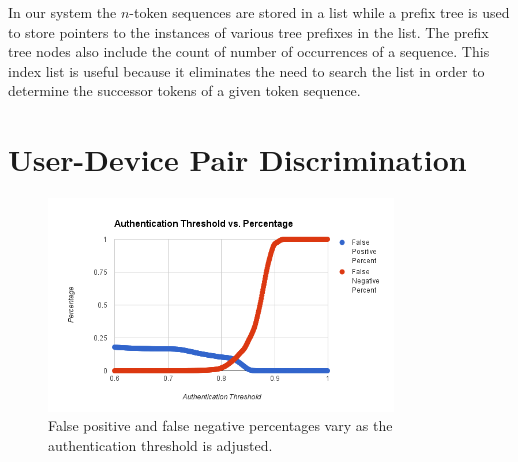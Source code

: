 \documentclass{acm_proc_article-sp}
\begin{document}
In our system the $n$-token sequences are stored in a list
while a prefix tree is used to store pointers to the
instances of various tree prefixes in the list.
The prefix tree nodes also include the count of number of occurrences of a sequence.
This index list is useful because it eliminates the need to search the list in order to determine the successor tokens of
a given token sequence.

\section{User-Device Pair Discrimination}
\label{sec:differentiation}

\begin{figure}
\centering
\includegraphics[width=3.6in]{threshold_vs_percentages.png}
\caption{False positive and false negative percentages vary as the authentication threshold is adjusted.}
\label{fig:threshold_vs_percentages}
\end{figure}
\end{document}
